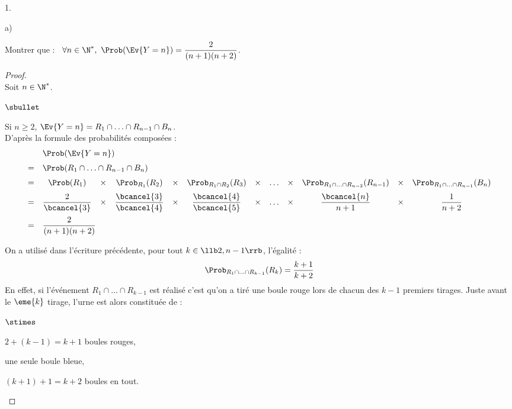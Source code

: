 \begin{noliste}{1.}
  \setcounter{enumi}{2}
\item
  \begin{noliste}{a)}
  \item Montrer que : \ $\forall n \in \N^*, \ \Prob(\Ev{Y = n}) =
    \dfrac{2}{(n+1)(n+2)}$.

    \begin{proof}~\\
      Soit $n \in \N^*$.
      \begin{noliste}{$\sbullet$}
      \item Si $n \geq 2$, $\Ev{Y = n} = R_1 \cap \ldots \cap 
      R_{n-1} \cap B_n$.\\
        D'après la formule des probabilités composées :
        \[
        \begin{array}{cccccccccccc}
          & \multicolumn{11}{l}{\Prob(\Ev{Y = n})} \\[.2cm]
          = & \multicolumn{11}{l}{\Prob(R_1 \cap \ldots \cap R_{n-1}
            \cap B_n)} \\[.2cm] 
          = & \Prob(R_1) & \times & \Prob_{R_1}(R_2) & \times & 
	  \Prob_{R_1
            \cap R_2}(R_3) & \times & \ldots & \times & \Prob_{R_1 \cap 
	    \ldots
            \cap R_{n-2}}(R_{n-1}) & \times & \Prob_{R_1 \cap \ldots 
	    \cap
            R_{n-1}}(B_n) \\[.2cm]
          = & \dfrac{2}{\bcancel{3}} & \times &
          \dfrac{\bcancel{3}}{\bcancel{4}} & \times & 
          \dfrac{\bcancel{4}}{\bcancel{5}} & \times & \ldots &
          \times & \dfrac{\bcancel{n}}{n+1} & \times &
          \dfrac{1}{n+2} \\[.4cm]
          = & \multicolumn{11}{l}{\dfrac{2}{(n+1)(n+2)}}
        \end{array}         
        \]

      \item On a utilisé dans l'écriture précédente, pour tout $k
        \in \llb 2, n-1 \rrb$, l'égalité :
        \[
        \Prob_{R_1 \cap \ldots \cap R_{k-1}}(R_k) = \dfrac{k+1}{k+2}
        \]
        En effet, si l'événement $R_1 \cap \ldots \cap R_{k-1}$ est
        réalisé c'est qu'on a tiré une boule rouge lors de chacun des
        $k-1$ premiers tirages. Juste avant le $\eme{k}$ tirage,
        l'urne est alors constituée de :
        \begin{noliste}{$\stimes$}
        \item $2 + (k-1) = k+1$ boules rouges,
        \item une seule boule bleue,
        \item $(k+1) + 1 = k+2$ boules en tout.
        \end{noliste}


\end{noliste}
\end{proof}
\end{noliste}
\end{noliste}
